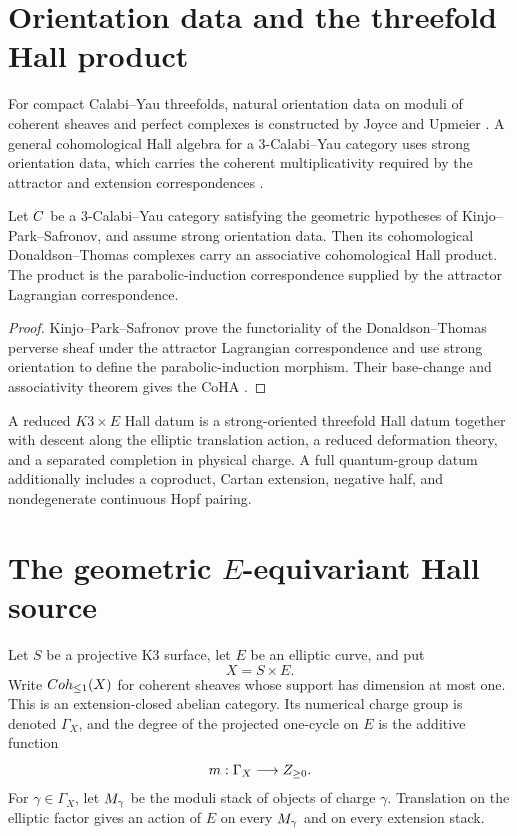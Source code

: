 \chapter{Orientation data and the threefold Hall product}
For compact Calabi--Yau threefolds, natural orientation data on moduli of coherent sheaves and perfect complexes is constructed by Joyce and Upmeier \cite{JoyceUpmeier}.  A general cohomological Hall algebra for a $3$-Calabi--Yau category uses strong orientation data, which carries the coherent multiplicativity required by the attractor and extension correspondences \cite{KPS}.

\begin{theorem}
Let $C$ be a $3$-Calabi--Yau category satisfying the geometric hypotheses of Kinjo--Park--Safronov, and assume strong orientation data.  Then its cohomological Donaldson--Thomas complexes carry an associative cohomological Hall product.  The product is the parabolic-induction correspondence supplied by the attractor Lagrangian correspondence.
\end{theorem}
\begin{proof}
Kinjo--Park--Safronov prove the functoriality of the Donaldson--Thomas perverse sheaf under the attractor Lagrangian correspondence and use strong orientation to define the parabolic-induction morphism.  Their base-change and associativity theorem gives the CoHA \cite{KPS}.
\end{proof}

\begin{definition}
A reduced $K3\times E$ Hall datum is a strong-oriented threefold Hall datum together with descent along the elliptic translation action, a reduced deformation theory, and a separated completion in physical charge.  A full quantum-group datum additionally includes a coproduct, Cartan extension, negative half, and nondegenerate continuous Hopf pairing.
\end{definition}

\chapter{The geometric \texorpdfstring{$E$}{E}-equivariant Hall source}
Let $S$ be a projective K3 surface, let $E$ be an elliptic curve, and put
\[
 X=S\times E.
\]
Write $Coh_{\leq1}(X)$ for coherent sheaves whose support has dimension at most one.  This is an extension-closed abelian category.  Its numerical charge group is denoted $\Gamma_X$, and the degree of the projected one-cycle on $E$ is the additive function
\[
 m:\Gamma_X\longrightarrow Z_{\geq0}.
\]
For $\gamma\in\Gamma_X$, let $M_\gamma$ be the moduli stack of objects of charge $\gamma$.  Translation on the elliptic factor gives an action of $E$ on every $M_\gamma$ and on every extension stack.


